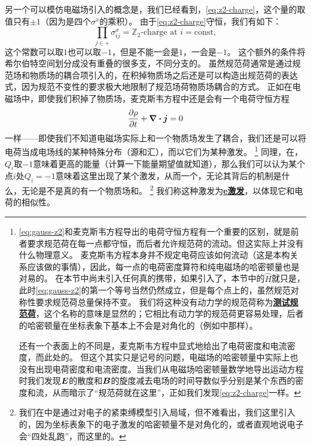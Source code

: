 \documentclass[hyperref, UTF8, a4paper]{ctexart}
\newcommand*{\const}{\mathrm{const}}
\newcommand*{\concept}[1]{\underline{\textbf{#1}}}
\newcommand*{\Ztwo}{$\mathbb{Z}_2$}
\begin{document}
另一个可以模仿电磁场引入的概念是，我们已经看到，\eqref{eq:z2-charge}，这个量的取值只有$\pm 1$（因为是四个$\sigma^x$的乘积）。
由于\eqref{eq:z2-charge}守恒，我们有如下：
\begin{equation}
    \prod_{j \in +} \sigma^x_{ij} = \text{\Ztwo -charge at $i$} = \const,
    \label{eq:gauss-z2}
\end{equation}
这个常数可以取$1$也可以取$-1$，但是不能一会是$1$，一会是$-1$。
这个额外的条件将希尔伯特空间划分成没有重叠的很多支，不同分支的。
虽然规范荷通常是通过规范场和物质场的耦合项引入的，在积掉物质场之后还是可以构造出规范荷的表达式，因为规范不变性的要求极大地限制了规范场荷物质场耦合的方式。
正如在电磁场中，即使我们积掉了物质场，麦克斯韦方程中还是会有一个电荷守恒方程
\[
    \pdv{\rho}{t} + \div{\vb*{j}} = 0
\]
一样——即使我们不知道电磁场实际上和一个物质场发生了耦合，我们还是可以将电荷当成电场线的某种特殊分布（源和汇），而以它们为某种激发。%
\footnote{
    \eqref{eq:gauss-z2}和麦克斯韦方程导出的电荷守恒方程有一个重要的区别，就是前者要求规范荷在每一点都守恒，而后者允许规范荷的流动。但这实际上并没有什么物理意义。
    麦克斯韦方程本身并不规定电荷应该如何流动（这是本构关系应该做的事情），因此，每一点的电荷密度算符和纯电磁场的哈密顿量也是对易的。
    在本节中尚未引入任何真的携带，如果引入了，本节中的$\hat{H}$就只是，此时\eqref{eq:gauss-z2}的第一个等号当然仍然成立，但是每个点上的，虽然规范对称性要求规范荷总量保持不变。 %
    我们将这种没有动力学的规范荷称为\concept{测试规范荷}，这个名称的意味是显然的；它相比有动力学的规范荷更容易处理，后者的哈密顿量在坐标表象下基本上不会是对角化的（例如中那样）。

    还有一个表面上的不同是，麦克斯韦方程中显式地给出了电荷密度和电流密度，而此处的。
    但这个其实只是记号的问题，电磁场的哈密顿量中实际上也没有出现电荷密度和电流密度。当我们从电磁场哈密顿量数学地导出运动方程时我们发现$\vb*{E}$的散度和$\vb*{B}$的旋度减去电场的时间导数似乎分别是某个东西的密度和流，从而暗示了“规范荷就在这里”，正如我们发现\eqref{eq:z2-charge}一样。
}%
同理，在，$Q_i$取$-1$意味着更高的能量（计算一下能量期望值就知道），那么我们可以认为某个点$i$处$Q_i=-1$意味着这里出现了某个激发，从而一个，无论其背后的机制是什么，无论是不是真的有一个物质场和。%
\footnote{
    我们在中是通过对电子的紧束缚模型引入局域，但不难看出，我们这里引入的，因为坐标表象下的电子激发的哈密顿量不是对角化的，或者直观地说电子会“四处乱跑”，而这里的。
}%
我们称这种激发为\concept{e激发}，以体现它和电荷的相似性。
\end{document}
